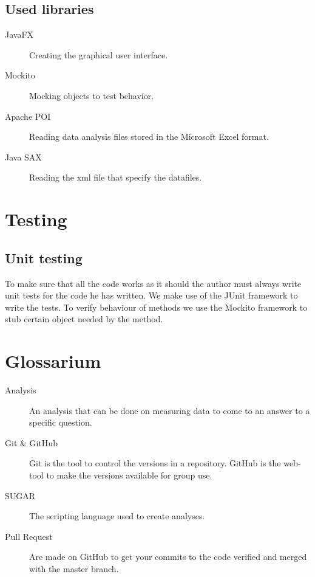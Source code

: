 \documentclass[a4paper]{article}
\begin{document}
\subsection{Used libraries}
\begin{description}
\item[JavaFX] Creating the graphical user interface.
\item[Mockito] Mocking objects to test behavior.
\item[Apache POI] Reading data analysis files stored in the Microsoft Excel format.
\item[Java SAX] Reading the xml file that specify the datafiles.
\end{description}

\section{Testing}
\subsection{Unit testing}
To make sure that all the code works as it should the author must always write
unit tests for the code he has written. We make use of the JUnit framework to
write the tests. To verify behaviour of methods we use the Mockito framework to
stub certain object needed by the method.

\section{Glossarium}

\begin{description}

\item[Analysis] An analysis that can be done on measuring data to come to an answer to a specific question.

\item[Git \& GitHub] Git is the tool to control the versions in a repository. GitHub is the web-tool to make the versions available for group use.

\item[SUGAR] The scripting language used to create analyses.

\item[Pull Request] Are made on GitHub to get your commits to the code verified and merged with the master branch.

\end{description}
\end{document}
